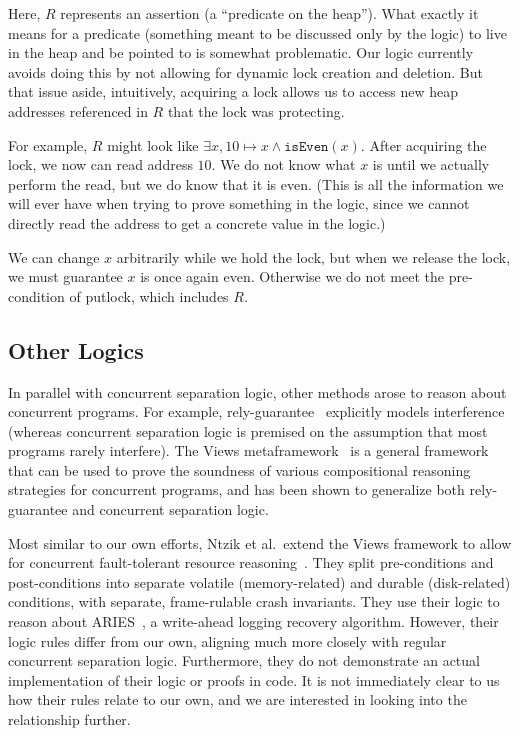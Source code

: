 Here, $R$ represents an assertion (a ``predicate on the heap'').
What exactly it means for a predicate (something meant to be
discussed only by the logic) to live in the heap and be pointed to
is somewhat problematic.
Our logic currently
avoids doing this by not allowing for dynamic lock creation and
deletion.
But
that issue aside, intuitively, acquiring a lock allows us to access new heap
addresses referenced in $R$ that the lock was protecting.

For example, $R$ might look like $\exists x, 10\mapsto x \wedge
\texttt{isEven}(x)$.
After acquiring the lock, we now can read address $10$.
We do not know what $x$ is until we actually perform the read, but we do know
that it is even.
(This is all the information we will ever have when
trying to prove something in the logic, since we cannot directly read the
address to get a concrete value in the logic.)

We can change $x$ arbitrarily while we hold the lock, but when we
release the lock, we must guarantee $x$ is once again even.
Otherwise we do
not meet the pre-condition of putlock, which includes $R$.

\subsection{Other Logics}

In parallel with concurrent separation logic, other methods arose to
reason about concurrent programs.
For example,
rely-guarantee~\cite{jones1981development} explicitly models interference
(whereas concurrent separation logic is premised on the assumption that most
programs rarely interfere).
The Views metaframework~\cite{dinsdale2013views} is a
general framework that can be used to prove the soundness of various
compositional reasoning strategies for concurrent programs, and has been shown
to generalize both rely-guarantee and concurrent separation logic.

Most similar to our own efforts, Ntzik et al.\ extend the Views framework to
allow for concurrent fault-tolerant resource reasoning~\cite{ntzik2015fault}.
They split pre-conditions and post-conditions into separate volatile
(memory-related) and durable (disk-related) conditions, with separate,
frame-rulable crash invariants.
They use their logic to reason about
ARIES~\cite{ntzik2015fault}, a write-ahead logging recovery algorithm.
However,
their logic rules differ from our own, aligning much more closely with
regular concurrent separation logic. Furthermore, they do not demonstrate an actual
implementation of their logic or proofs in code.
It is not immediately clear to us how their rules relate to our own, and we are
interested in looking into the relationship further.

